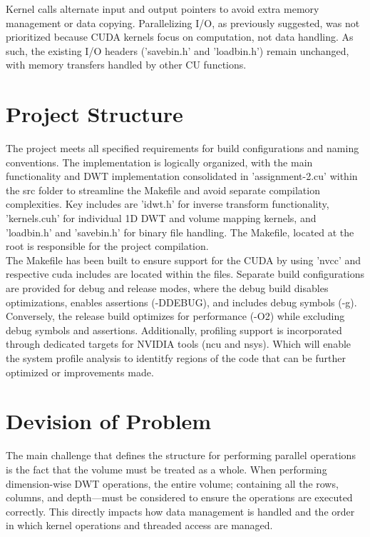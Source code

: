 \documentclass[journal,11pt]{IEEEtran}
\begin{document}
Kernel calls alternate input and output pointers to avoid extra memory management or data copying. Parallelizing I/O, as previously suggested, was not prioritized because CUDA kernels focus on computation, not data handling. As such, the existing I/O headers ('savebin.h' and 'loadbin.h') remain unchanged, with memory transfers handled by other CU functions.

\section{Project Structure}
The project meets all specified requirements for build configurations and naming conventions. The implementation is logically organized, with the main functionality and DWT implementation consolidated in 'assignment-2.cu' within the src folder to streamline the Makefile and avoid separate compilation complexities. Key includes are 'idwt.h' for inverse transform functionality, 'kernels.cuh' for individual 1D DWT and volume mapping kernels, and 'loadbin.h' and 'savebin.h' for binary file handling. The Makefile, located at the root is responsible for the project compilation.\\

The Makefile has been built to ensure support for the CUDA by using 'nvcc' and respective cuda includes are located within the files. Separate build configurations are provided for debug and release modes, where the debug build disables optimizations, enables assertions (-DDEBUG), and includes debug symbols (-g). Conversely, the release build optimizes for performance (-O2) while excluding debug symbols and assertions. Additionally, profiling support is incorporated through dedicated targets for NVIDIA tools (ncu and nsys). Which will enable the system profile analysis to identitfy regions of the code that can be further optimized or improvements made.

\section{Devision of Problem}

The main challenge that defines the structure for performing parallel operations is the fact that the volume must be treated as a whole. When performing dimension-wise DWT operations, the entire volume; containing all the rows, columns, and depth—must be considered to ensure the operations are executed correctly. This directly impacts how data management is handled and the order in which kernel operations and threaded access are managed.\\
\end{document}
